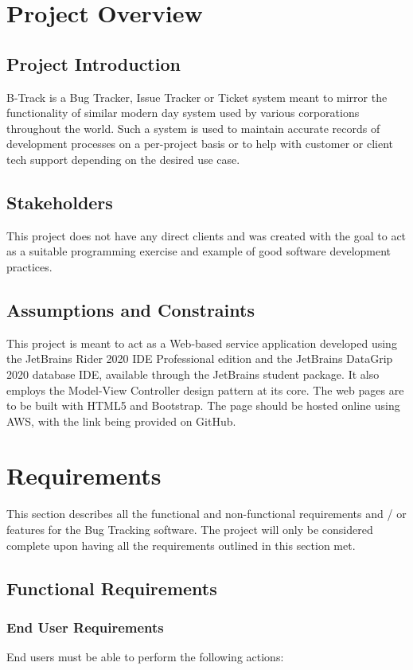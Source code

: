 \documentclass[openany, oneside,11pt]{book}
\begin{document}
\chapter{Project Overview}
\thispagestyle{fancy}

\section{Project Introduction}
B-Track is a Bug Tracker, Issue Tracker or Ticket system meant to mirror the functionality of similar modern day system used by various corporations throughout the world. Such a system is used to maintain accurate records of development processes on a per-project basis or to help with customer or client tech support depending on the desired use case. 
\section{Stakeholders}

This project does not have any direct clients and was created with the goal to act as a suitable programming exercise and example of good software development practices.
\section{Assumptions and Constraints}

This project is meant to act as a Web-based service application developed using the JetBrains Rider 2020 IDE Professional edition and the JetBrains DataGrip 2020 database IDE, available through the JetBrains student package. It also employs the Model-View Controller design pattern at its core. The web pages are to be built with HTML5 and Bootstrap. The page should be hosted online using AWS, with the link being provided on GitHub.


\chapter{Requirements}
\thispagestyle{fancy}
This section describes all the functional and non-functional requirements and / or features for the Bug Tracking software. The project will only be considered complete upon having all the requirements outlined in this section met.

\section{Functional Requirements}
\subsection{End User Requirements}
End users must be able to perform the following actions:

\thispagestyle{fancy}
\end{document}
